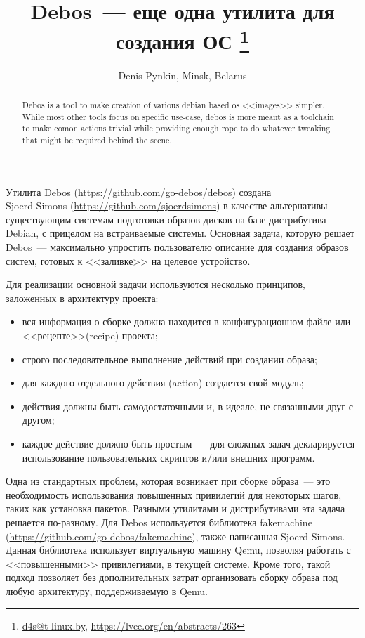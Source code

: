 \documentclass[10pt, a5paper]{article}
\begin{document}
\title{Debos~--- еще одна утилита для создания ОС
\footnote{\url{d4s@t-linux.by}, \url{https://lvee.org/en/abstracts/263}}}
\author{Denis Pynkin, Minsk, Belarus}
\maketitle
\begin{abstract}
Debos is a tool to make creation of various debian based os <<images>> simpler. While most other tools focus on specific use-case, debos is more meant as a toolchain to make comon actions trivial while providing enough rope to do whatever tweaking that might be required behind the scene.
\end{abstract}
Утилита Debos (\url{https://github.com/go-debos/debos}) создана \\Sjoerd Simons (\url{https://github.com/sjoerdsimons}) в качестве альтернативы существующим системам подготовки образов дисков на базе дистрибутива Debian, с прицелом на встраиваемые системы. Основная задача, которую решает Debos~--- максимально упростить пользователю описание для создания образов систем, готовых к <<заливке>> на целевое устройство.

Для реализации основной задачи используются несколько принципов, заложенных в архитектуру проекта:

\begin{itemize}
  \item вся информация о сборке должна находится в конфигурационном файле или <<рецепте>>(recipe) проекта;
  \item строго последовательное выполнение действий при создании образа;
  \item для каждого отдельного действия (action) создается свой модуль;
  \item действия должны быть самодостаточными и, в идеале, не связанными друг с другом;
  \item каждое действие должно быть простым~--- для сложных задач декларируется использование пользовательких скриптов и/или внешних программ.
\end{itemize}

Одна из стандартных проблем, которая возникает при сборке образа~--- это необходимость использования повышенных привилегий для некоторых шагов, таких как установка пакетов. Разными утилитами и дистрибутивами эта задача решается по-разному. Для Debos используется библиотека fakemachine (\url{https://github.com/go-debos/fakemachine}), также написанная Sjoerd Simons. Данная библиотека использует виртуальную машину Qemu, позволяя работать с <<повышенными>> привилегиями, в текущей системе. Кроме того, такой подход позволяет без дополнительных затрат организовать сборку образа под любую архитектуру, поддерживаемую в Qemu.
\end{document}
